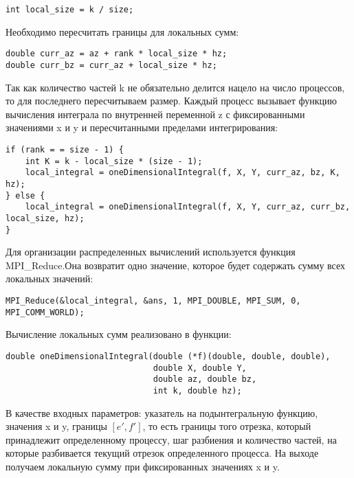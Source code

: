 \documentclass{report}
\begin{document}
\begin{lstlisting}
int local_size = k / size;
\end{lstlisting}
\par Необходимо пересчитать границы для локальных сумм:
\begin{lstlisting}
double curr_az = az + rank * local_size * hz;
double curr_bz = curr_az + local_size * hz;
\end{lstlisting}
\par Так как количество частей k не обязательно делится нацело на число процессов, то для последнего пересчитываем размер. Каждый процесс вызывает функцию вычисления интеграла по внутренней переменной z с фиксированными значениями x и y и пересчитанными пределами интегрирования:
\begin{lstlisting}
if (rank = = size - 1) {
    int K = k - local_size * (size - 1);
    local_integral = oneDimensionalIntegral(f, X, Y, curr_az, bz, K, hz);
} else {
    local_integral = oneDimensionalIntegral(f, X, Y, curr_az, curr_bz, local_size, hz);
}
\end{lstlisting}
\par Для организации распределенных вычислений используется функция MPI\_Reduce.Она возвратит одно значение, которое будет содержать сумму всех локальных значений:
\begin{lstlisting}
MPI_Reduce(&local_integral, &ans, 1, MPI_DOUBLE, MPI_SUM, 0, MPI_COMM_WORLD);
\end{lstlisting}
\par Вычисление локальных сумм реализовано в функции:
\begin{lstlisting}
double oneDimensionalIntegral(double (*f)(double, double, double),
                              double X, double Y,
                              double az, double bz,
                              int k, double hz);
\end{lstlisting}
\par  В качестве входных параметров: указатель на подынтегральную функцию, значения x и y, границы $[e\prime ,f\prime ]$, то есть границы того отрезка, который принадлежит определенному процессу, шаг разбиения и количество частей, на которые разбивается текущий отрезок определенного процесса. На выходе получаем локальную сумму при фиксированных значениях x и y. 
\newpage
\end{document}
